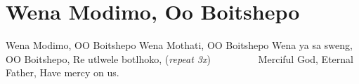 \starttocol
\chapter{Wena Modimo, Oo Boitshepo}
\nexttocol
\hfill{\it }
\stoptocol
\starttocol
\startlines
W{\sc ena} Modimo, OO Boitshepo 
Wena Mothati, OO Boitshepo
Wena ya sa sweng, OO Boitshepo,
Re utlwele botlhoko,
 \hfill({\it repeat 3x})~~~~~~~~~
\stoplines
\nexttocol
Merciful God, Eternal Father,
Have mercy on us.
\stoptocol
